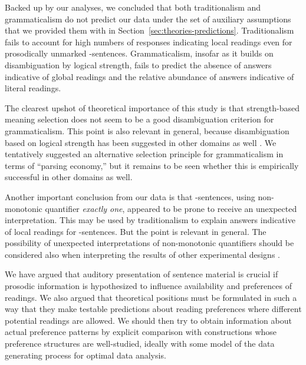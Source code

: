 \documentclass[fleqn,reqno,10pt]{article}
\renewcommand{\es}{\acro{es}}
\begin{document}
Backed up by our analyses, we concluded that both traditionalism and
grammaticalism do not predict our data under the set of auxiliary
assumptions that we provided them with in
Section~\ref{sec:theories-predictions}. Traditionalism fails to
account for high numbers of responses indicating local readings even
for prosodically unmarked \es-sentences. Grammaticalism, insofar as it
builds on disambiguation by logical strength, fails to predict the
absence of answers indicative of global readings and the relative
abundance of answers indicative of literal readings.

The clearest upshot of theoretical importance of this study is that
strength-based meaning selection does not seem to be a good
disambiguation criterion for grammaticalism. This point is also
relevant in general, because disambiguation based on logical strength
has been suggested in other domains as well
\citep[e.g.][]{DalrympleKanazawa1998:Reciprocal-Expr,Winter2001:Plural-Predicat,CobrerosEgre2012:Tolerant-Classi}.
We tentatively suggested an alternative selection principle for
grammaticalism in terms of ``parsing economy,'' but it remains to be
seen whether this is empirically successful in other domains as well.

Another important conclusion from our data is that \es-sentences,
using non-monotonic quantifier \emph{exactly one}, appeared to be
prone to receive an unexpected interpretation. This may be used by
traditionalism to explain answers indicative of local readings for
\es-sentences. But the point is relevant in general. The possibility
of unexpected interpretations of non-monotonic quantifiers should be
considered also when interpreting the results of other experimental
designs \citep[e.g.][]{CliftonDube2010:Embedded-Implic,
  ChemlaSpector2010:Experimental-Ev}.

We have argued that auditory presentation of sentence material is crucial if
prosodic information is hypothesized to influence
availability and preferences of readings. We also argued that
theoretical positions must be formulated in such a way that they make
testable predictions about reading preferences where different
potential readings are allowed. We should then try to obtain
information about actual preference patterns by explicit comparison
with constructions whose preference structures are well-studied, ideally
with some model of the data generating process for optimal data
analysis.

\newpage

\appendix
\end{document}
